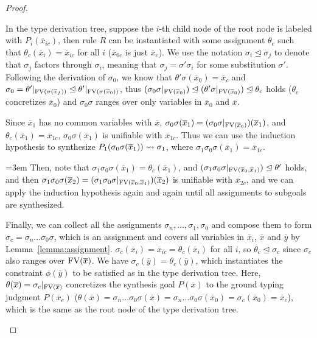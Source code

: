\begin{proof}
\begin{itemize}
    In the type derivation tree, suppose the $i$-th child node of the root node is labeled with $P_i(\overline{x}_{ic})$, then rule $R$ can be instantiated with some assignment $\theta_c$ such that $\theta_c(\overline{x}_i) = \overline{x}_{ic}$ for all $i$ ($\overline{x}_{0c}$ is just $\overline{x}_{c}$).
    We use the notation $\sigma_i \trianglelefteq \sigma_j$ to denote that $\sigma_j$ factors through $\sigma_i$, meaning that $\sigma_j = \sigma'\sigma_i$ for some substitution $\sigma'$.
    Following the derivation of $\sigma_0$, we know that $\theta'\sigma(\overline{x}_0) = \overline{x}_c$ and $\sigma_0 = \theta'|_{\text{FV}(\sigma(\overline{x}_f))}\trianglelefteq \theta'|_{\text{FV}(\sigma(\overline{x}_0))}$, thus $(\sigma_0\sigma|_{\text{FV}(\overline{x}_0)})\trianglelefteq (\theta'\sigma|_{\text{FV}(\overline{x}_0)}) \trianglelefteq \theta_c$ holds ($\theta_c$ concretizes $\overline{x}_0$) and $\sigma_0\sigma$ ranges over only variables in $\overline{x}_0$ and $\overline{x}$.
    
    Since $\overline{x}_1$ has no common variables with $\overline{x}$, $\sigma_0\sigma(\overline{x}_1)= (\sigma_0\sigma|_{\text{FV}(\overline{x}_0)})(\overline{x}_1)$, and $\theta_c(\overline{x}_1)=\overline{x}_{1c}$, $\sigma_0\sigma(\overline{x}_1)$ is unifiable with $\overline{x}_{1c}$.
    Thus we can use the induction hypothesis to synthesize $P_1( \sigma_0\sigma(\overline{x}_1) ) \leadsto \sigma_1$, where $\sigma_1\sigma_0\sigma(\overline{x}_1) = \overline{x}_{1c}$.
    
    \emergencystretch=3em
    Then, note that $\sigma_1\sigma_0\sigma(\overline{x}_1) = \theta_c(\overline{x}_1)$, and $(\sigma_1\sigma_0\sigma|_{\text{FV}(\overline{x}_0,\overline{x}_1)}) \allowbreak\trianglelefteq \theta'$ holds, and then $\sigma_1\sigma_0\sigma(\overline{x}_2)=\allowbreak(\sigma_1\sigma_0\sigma|_{\text{FV}(\overline{x}_0,\overline{x}_1)})(\overline{x}_2)$ is unifiable with $\overline{x}_{2c}$, and we can apply the induction hypothesis again and again until all assignments to subgoals are synthesized.

    \emergencystretch=0pt
    Finally, we can collect all the assignments $\sigma_n, \ldots, \sigma_1, \sigma_0$ and compose them to form $\sigma_c = \sigma_n \ldots \sigma_0\sigma$, which is an assignment and covers all variables in $\overline{x}_i$, $\overline{x}$ and $\overline{y}$ by Lemma~\ref{lemma:assignment}. $\sigma_c(\overline{x}_i)=\overline{x}_{ic}=\theta_c(\overline{x}_i)$ for all $i$, so $\theta_c \trianglelefteq \sigma_c$ since $\sigma_c$ also ranges over $\text{FV}(\overline{x})$.
    We have $\sigma_c(\overline{y}) = \theta_c(\overline{y})$, which instantiates the constraint $\phi(\overline{y})$ to be satisfied as in the type derivation tree. Here, $\theta(\overline{x}) = \sigma_c|_{\text{FV}(\overline{x})}$ concretizes the synthesis goal $P(\overline{x})$ to the ground typing judgment $P(\overline{x}_c)$ ($\theta(\overline{x})=\sigma_n \ldots \sigma_0\sigma(\overline{x})=\sigma_n \ldots \sigma_0\sigma(\overline{x}_0)=\sigma_c(\overline{x}_0)=\overline{x}_c$), which is the same as the root node of the type derivation tree.
  \end{itemize}
\end{proof}

